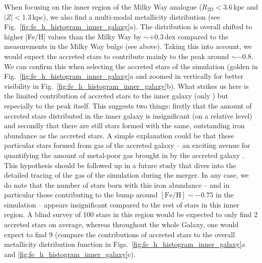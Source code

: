 \documentclass[fleqn,usenatbib]{mnras}
\begin{document}
When focusing on the inner region of the Milky Way analogue ($R_\mathrm{2D} < 3.6\,\mathrm{kpc}$ and $\vert Z\vert < 1.3\,\mathrm{kpc}$), we also find a multi-modal metallicity distribution (see Fig.~\ref{fig:fe_h_histogram_inner_galaxy}a). The distribution is overall shifted to higher [Fe/H] values than the Milky Way by $\sim+0.3\,\mathrm{dex}$ compared to the measurements in the Milky Way bulge (see above). Taking this into account, we would expect the accreted stars to contribute mainly to the peak around $\sim-0.8$. We can confirm this when selecting the accreted stars of the simulation (golden in Fig.~\ref{fig:fe_h_histogram_inner_galaxy}a and zoomed in vertically for better visibility in Fig.~\ref{fig:fe_h_histogram_inner_galaxy}b). What strikes us here is the limited contribution of accreted stars to the inner galaxy (only ) but especially to the peak itself. This suggests two things: firstly that the amount of accreted stars distributed in the inner galaxy is insignificant (on a relative level) and secondly that there are still stars formed with the same, outstanding iron abundance as the accreted stars. A simple explanation could be that these particular stars formed from gas of the accreted galaxy -- an exciting avenue for quantifying the amount of metal-poor gas brought in by the accreted galaxy \citep{Buck2023}. This hypothesis should be followed up in a future study that dives into the detailed tracing of the gas of the simulation during the merger. In any case, we do note that the number of stars born with this iron abundance -- and in particular those contributing to the bump around $\mathrm{[Fe/H] \sim -0.75}$ in the simulation -- appears insignificant compared to the rest of stars in this inner region. A blind survey of 100 stars in this region would be expected to only find 2 accreted stars on average, whereas throughout the whole Galaxy, one would expect to find 9 (compare the contributions of accreted stars to the overall metallicity distribution function in Figs.~\ref{fig:fe_h_histogram_inner_galaxy}a and \ref{fig:fe_h_histogram_inner_galaxy}c).
\end{document}
